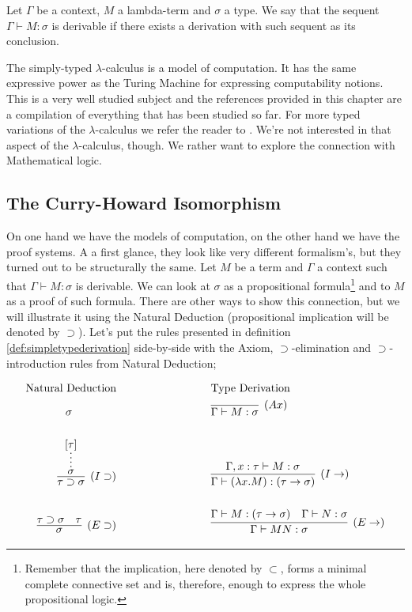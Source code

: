\begin{mydef}[Derivability]
Let $\Gamma$ be a context, $M$ a lambda-term and $\sigma$ a type. We say that
the sequent $\Gamma \vdash M : \sigma$ is derivable if there exists a derivation with
such sequent as its conclusion.
\end{mydef}

The simply-typed $\lambda$-calculus is a model of computation. It has the same expressive power as
the Turing Machine for expressing computability notions. This is a very well studied subject
and the references provided in this chapter are a compilation of everything that
has been studied so far. For more typed variations of the $\lambda$-calculus we refer the reader
to \cite{Barendregt03}. We're not interested in that aspect of the $\lambda$-calculus, 
though. We rather want to explore the connection with Mathematical logic.

\subsection{The Curry-Howard Isomorphism}
\label{sec:background:curryhoward}

On one hand we have the models of computation, on the other hand we have the proof systems.
A a first glance, they look like very different formalism's, but they turned out to be
structurally the same. Let $M$ be a term and $\Gamma$ a context such that
$\Gamma \vdash M : \sigma$ is derivable. We can look at $\sigma$ as a propositional formula\footnote{
Remember that the implication, here denoted by $\subset$, forms a minimal complete connective set
and is, therefore, enough to express the whole propositional logic.
} and to $M$ as a proof of such formula. There are other ways to show this connection,
but we will illustrate it using the Natural Deduction\cite{Prawitz01} (propositional implication will be denoted by $\supset$). Let's put the rules presented in definition
\ref{def:simpletypederivation} side-by-side with the Axiom, $\supset$-elimination and
$\supset$-introduction rules from Natural Deduction;

\begin{center}
\begin{align*}
	\text{Natural Deduction} & \hspace{3cm} \text{Type Derivation} \\
	\sigma \hspace{1.4cm} & \hspace{3cm} \infer[(Ax)]{\Gamma \vdash M : \sigma}{}  \\[0.5cm]
	\infer[(I\supset)]{\tau \supset \sigma}{\infer*{\sigma}{[\tau]}}
		& \hspace{3cm} 
		\infer[(I\rightarrow)]{\Gamma \vdash (\lambda x . M) : (\tau \rightarrow \sigma)}
							  {\Gamma, x:\tau \vdash M : \sigma} \\[0.5cm]					  
	\infer[(E\supset)]{\sigma}{\tau \supset \sigma & \tau}
		& \hspace{3cm}
		\infer[(E\rightarrow)]{\Gamma \vdash MN : \sigma}
			{ \Gamma \vdash M : (\tau \rightarrow \sigma) & \Gamma \vdash N : \sigma}
\end{align*} 
\end{center}

